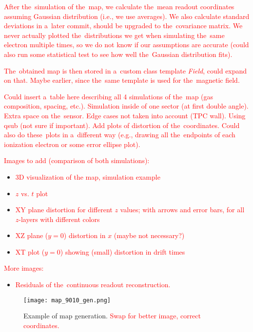 		\textcolor{red}{After the~simulation of the~map, we calculate the~mean readout coordinates assuming Gaussian distribution (i.e., we use averages). We also calculate standard deviations in a~later commit, should be upgraded to the~covariance matrix. We never actually plotted the~distributions we get when simulating the~same electron multiple times, so we do not know if our assumptions are accurate (could also run some statistical test to see how well the~Gaussian distribution fits).}
		
		\textcolor{red}{The~obtained map is then stored in a~custom class template \textit{Field}, could expand on that. Maybe earlier, since the~same template is used for the~magnetic field.}
		
		\textcolor{red}{Could insert a~table here describing all 4 simulations of the~map (gas composition, spacing, etc.). Simulation inside of one sector (at first double angle). Extra space on the~sensor. Edge cases not taken into account (TPC wall). Using qsub (not sure if important). Add plots of distortion of the~coordinates. Could also do these~plots in a~different way (e.g., drawing all the~endpoints of each ionization electron or some error ellipse plot).}
		
		\textcolor{red}{Images to add (comparison of both simulations):}
		\begin{itemize}
			\item \textcolor{red}{3D visualization of the map, simulation example}
			\item \textcolor{red}{$z$ vs. $t$ plot}
			\item \textcolor{red}{XY plane distortion for different $z$ values; with arrows and error bars, for all $z$-layers with different colors}
			\item \textcolor{red}{XZ plane ($y = 0$) distortion in $x$ (maybe not necessary?)}
			\item \textcolor{red}{XT plot ($y = 0$) showing (small) distortion in drift times}
		\end{itemize}
		
		\textcolor{red}{More images:}
		\begin{itemize}
			\item \textcolor{red}{Residuals of the~continuous readout reconstruction.}
		\end{itemize}		
		
		\begin{figure}[H]
			\centering
			\texttt{[image: map\_9010\_gen.png]}
			\caption{Example of map generation. \textcolor{red}{Swap for better image, correct coordinates.}}
			\label{fig:map9010gen}
		\end{figure}
		
